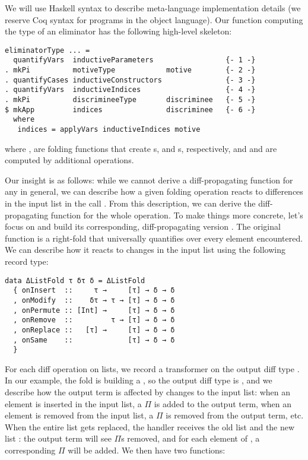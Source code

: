 %
We will use Haskell syntax to describe meta-language implementation details (we
reserve Coq syntax for programs in the object language).  Our function computing
the type of an eliminator has the following high-level skeleton:

\noindent
\begin{verbatim}
eliminatorType ... =
  quantifyVars  inductiveParameters                 {- 1 -}
. mkPi          motiveType            motive        {- 2 -}
. quantifyCases inductiveConstructors               {- 3 -}
. quantifyVars  inductiveIndices                    {- 4 -}
. mkPi          discrimineeType       discriminee   {- 5 -}
$ mkApp         indices               discriminee   {- 6 -}
  where
   indices = applyVars inductiveIndices motive
\end{verbatim}

\noindent where ,  are
folding functions that create s, and s,
respectively, and  and  are
computed by additional  operations.

Our insight is as follows: while we cannot derive a diff-propagating function
for any  in general, we can describe how a given folding
operation  reacts to differences in the input list  in
the call .  From this description, we can derive the
diff-propagating function for the whole  operation.  To make
things more concrete, let's focus on  and build
its corresponding, diff-propagating version .
The original function is a right-fold that universally quantifies over every
element encountered. We can describe how it reacts to changes in the input list
using the following record type:

\begin{verbatim}
data ΔListFold τ δτ δ = ΔListFold
  { onInsert  ::     τ →     [τ] → δ → δ
  , onModify  ::    δτ → τ → [τ] → δ → δ
  , onPermute :: [Int] →     [τ] → δ → δ
  , onRemove  ::         τ → [τ] → δ → δ
  , onReplace ::   [τ] →     [τ] → δ → δ
  , onSame    ::             [τ] → δ → δ
  }
\end{verbatim}

\noindent For each diff operation on lists, we record a transformer on the
output diff type .  In our example, the fold is building a
, so the output diff type is , and we describe
how the output term is affected by changes to the input list: when an element is
inserted in the input list, a $\Pi$ is added to the output term, when an element
is removed from the input list, a $\Pi$ is removed from the output term, etc.
When the entire list gets replaced, the handler receives the old list
 and the new list : the output term will see
 $\Pi$s removed, and for each element of , a
corresponding $\Pi$ will be added.  We then have two functions:

